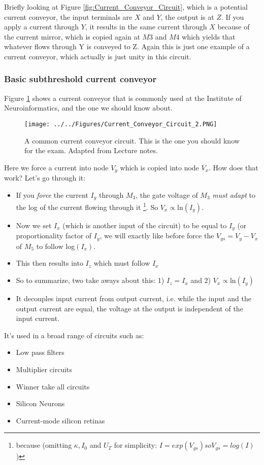 Briefly looking at Figure \ref{fig:Current_Conveyor_Circuit}, which is a potential current conveyor, the input terminals are $X$ and $Y$, the output is at $Z$. If you apply a current through $Y$, it results in the same current through $X$ because of the current mirror, which is copied again at $M3$ and $M4$ which yields that whatever flows through Y is conveyed to Z. Again this is just one example of a current conveyor, which actually is just unity in this circuit. 

\subsubsection{Basic subthreshold current conveyor}

Figure \ref{fig:Current_Conveyor_Circuit_2} shows a current conveyor that is commonly used at the Institute of Neuroinformatics, and the one we should know about. 

\begin{figure}[H]
    \centering
    \texttt{[image: ../../Figures/Current\_Conveyor\_Circuit\_2.PNG]}
    \caption{A common current conveyor circuit. This is the one you should know for the exam. Adapted from Lecture notes.}
    \label{fig:Current_Conveyor_Circuit_2}
\end{figure}

Here we force a current into node $V_y$ which is copied into node $V_x$. How does that work? Let's go through it: 
\begin{itemize}
    \item If you \textit{force} the current $I_y$ through $M_3$, the gate voltage of $M_3$ \textit{must adapt} to the log of the current flowing through it \footnote{because (omitting $\kappa, I_0$ and $U_T$ for simplicity: $I = exp(V_{gs}) so V_{gs} = log(I)$)}.  So $V_x \propto \mathrm{ln}(I_y)$.
    \item Now we set $I_x$ (which is another input of the circuit) to be equal to $I_y$ (or proportionality factor of $I_y$, we will exactly like before force the $V_{gs} = V_y - V_x$ of $M_5$ to follow log$(I_x)$. 
    \item This then results into $I_z$ which must follow $I_x$
    \item So to summarize, two take aways about this: 1) $I_z = I_x$ and 2) $V_x \propto \mathrm{ln}(I_y)$
    \item It decouples input current from output current, i.e. while the input and the output current are equal, the voltage at the output is independent of the input current. 
\end{itemize}

It's used in a broad range of circuits such as: 
\begin{itemize}
    \item Low pass filters
    \item Multiplier circuits 
    \item Winner take all circuits 
    \item Silicon Neurons
    \item Current-mode silicon retinas
\end{itemize}